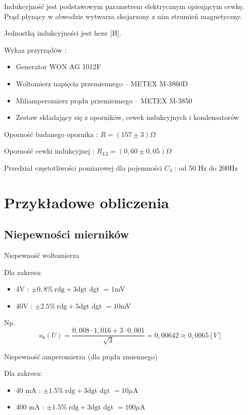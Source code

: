 \documentclass[12pt]{article}
\begin{document}
Indukcyjność jest podstawowym parametrem elektrycznym opisującym cewkę.
Prąd płynący w obwodzie wytwarza skojarzony z nim strumień magnetyczny.

Jednostką indukcyjności jest henr [H].

\pagebreak

Wykaz przyrządów :
\begin{itemize}
    \item Generator WON AG 1012F
    \item Woltomierz napięcia przemiennego -- METEX M-3860D
    \item Miliamperomierz prądu przemiennego -- METEX M-3850
    \item Zestaw składający się z oporników, cewek indukcyjnych i kondensatorów
\end{itemize}

Oporność badanego opornika : $ R = (157 \pm 3) \Omega $

Oporność cewki indukcyjnej : $ R_{L2} = (0,60 \pm 0,05) \Omega $

Przedział częstotliwości pomiarowej dla pojemności $C_3$ : od 50 Hz do 200Hz

\section{Przykładowe obliczenia}
\subsection{Niepewności mierników}

Niepewność woltomierza

Dla zakresu:
\begin{itemize}
    \item 4V : $ \pm 0,8 \% \ \textrm{rdg} + 3\textrm{dgt}$ \quad dgt $=1$mV
    \item 40V : $ \pm 2.5 \% \ \textrm{rdg} + 5\textrm{dgt} $ \quad dgt $=10$mV
\end{itemize} \bigskip

Np.
\[ u_b(U) = \frac{0,008 \cdot 1,016 + 3 \cdot 0,001}{\sqrt{3}} = 0,00642 \approx 0,0065[V] \] \bigskip

Niepewność amperomierza (dla prądu zmiennego)

Dla zakresu:
\begin{itemize}
    \item 40 mA : $ \pm 1.5\% \ \textrm{rdg} + 3\textrm{dgt} $ \quad dgt $=10\mu$A
    \item 400 mA : $ \pm 1.5\% \ \textrm{rdg} + 3\textrm{dgt} $ \quad dgt $=100\mu$A
\end{itemize}
\end{document}
